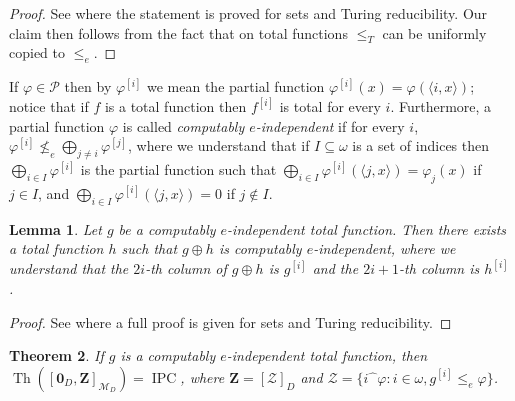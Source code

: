 \documentclass[11pt]{amsart}
\renewcommand{\phi}{\varphi}
\newtheorem{theorem}{Theorem}[section]
\newtheorem{lemma}[theorem]{Lemma}
\newcommand{\Th}{\operatorname{Th}}
\newcommand{\IPC}{\operatorname{IPC}}
\newcommand{\Dym}{\mathscr{M}_{D}}
\newcommand{\cat}[2]{#1\widehat{\phantom{\alpha}}\!#2}
\newcommand{\MP}[1]{\ensuremath{\mathcal{#1}}}
\begin{document}
\begin{proof}
See \cite{Kuyper-Medvedev} where the statement is proved for sets and Turing 
reducibility. Our claim then follows from the fact that on total functions 
$\le_T$ can be uniformly copied to $\leq_e$.
\end{proof}

If $\phi \in \MP{P}$ then by $\phi^{[i]}$ we mean the partial function 
$\phi^{[i]}(x)=\phi(\langle i,x\rangle)$; notice that if $f$ is a total 
function then $f^{[i]}$ is total for every $i$. Furthermore, a partial 
function $\phi$ is called \emph{computably $e$-independent} if for every $i$, 
$\phi^{[i]} \nleq_e \bigoplus_{j\ne i} \phi^{[j]}$, where we understand that 
if $I\subseteq \omega$ is a set of indices then $\bigoplus_{i \in I} 
\phi^{[i]}$ is the partial function such that $\bigoplus_{i \in I} 
\phi^{[i]}(\langle j,x\rangle)=\phi_j(x)$ if $j \in I$, and $\bigoplus_{i \in 
I} \phi^{[i]}(\langle j,x\rangle)=0$ if $j \notin I$. 

\begin{lemma}\cite[Lemma~4.11]{Kuyper-Medvedev}\label{lem:main22}
Let $g$ be a computably $e$-independent total function. Then there exists a 
total function $h$ such that $g \oplus h$ is computably $e$-independent, 
where we understand that the $2i$-th column of $g \oplus h$ is $g^{[i]}$ and 
the $2i+1$-th column is $h^{[i]}$. 
\end{lemma}

\begin{proof}
See \cite{Kuyper-Medvedev} where a full proof is given for sets and Turing 
reducibility. 
\end{proof}

\begin{theorem}\label{thm:main2}
If $g$ is a computably $e$-independent total function, then $\Th(\left[ 
\mathbf{0}_{D}, \mathbf{Z}\right]_{\Dym}) =\IPC$, where 
$\mathbf{Z}=[\MP{Z}]_D$ and $\MP{Z}=\{\cat{i}{\phi}: i \in \omega, 
g^{[i]}\le_{e} \phi\}$.
\end{theorem}
\end{document}
